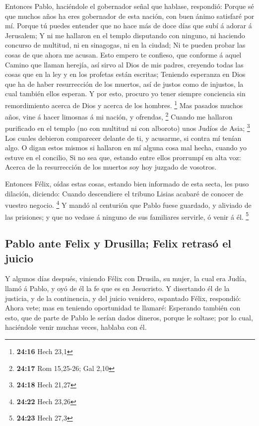  Entonces Pablo, haciéndole el gobernador señal que
hablase, respondió: Porque sé que muchos años ha eres gobernador de esta
nación, con buen ánimo satisfaré por mí.  Porque tú
puedes entender que no hace más de doce días que subí á adorar á
Jerusalem;  Y ni me hallaron en el templo disputando con
ninguno, ni haciendo concurso de multitud, ni en sinagogas, ni en la
ciudad;  Ni te pueden probar las cosas de que ahora me
acusan.  Esto empero te confieso, que conforme á aquel
Camino que llaman herejía, así sirvo al Dios de mis padres, creyendo
todas las cosas que en la ley y en los profetas están escritas;
 Teniendo esperanza en Dios que ha de haber resurrección
de los muertos, así de justos como de injustos, la cual también ellos
esperan.  Y por esto, procuro yo tener siempre conciencia
sin remordimiento acerca de Dios y acerca de los hombres. \footnote{\textbf{24:16}
  Hech 23,1}  Mas pasados muchos años, vine á hacer
limosnas á mi nación, y ofrendas, \footnote{\textbf{24:17} Rom 15,25-26;
  Gal 2,10}  Cuando me hallaron purificado en el templo
(no con multitud ni con alboroto) unos Judíos de Asia; \footnote{\textbf{24:18}
  Hech 21,27}  Los cuales debieron comparecer delante de
ti, y acusarme, si contra mí tenían algo.  O digan estos
mismos si hallaron en mí alguna cosa mal hecha, cuando yo estuve en el
concilio,  Si no sea que, estando entre ellos prorrumpí
en alta voz: Acerca de la resurrección de los muertos soy hoy juzgado de
vosotros.

 Entonces Félix, oídas estas cosas, estando bien
informado de esta secta, les puso dilación, diciendo: Cuando descendiere
el tribuno Lisias acabaré de conocer de vuestro negocio. \footnote{\textbf{24:22}
  Hech 23,26}  Y mandó al centurión que Pablo fuese
guardado, y aliviado de las prisiones; y que no vedase á ninguno de sus
familiares servirle, ó venir á él. \footnote{\textbf{24:23} Hech 27,3}

\hypertarget{pablo-ante-felix-y-drusilla-felix-retrasuxf3-el-juicio}{%
\subsection{Pablo ante Felix y Drusilla; Felix retrasó el
juicio}\label{pablo-ante-felix-y-drusilla-felix-retrasuxf3-el-juicio}}

 Y algunos días después, viniendo Félix con Drusila, su
mujer, la cual era Judía, llamó á Pablo, y oyó de él la fe que es en
Jesucristo.  Y disertando él de la justicia, y de la
continencia, y del juicio venidero, espantado Félix, respondió: Ahora
vete; mas en teniendo oportunidad te llamaré:  Esperando
también con esto, que de parte de Pablo le serían dados dineros, porque
le soltase; por lo cual, haciéndole venir muchas veces, hablaba con él.

